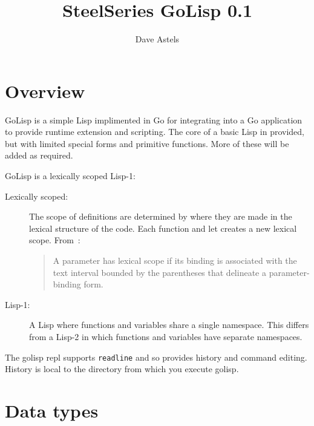 \documentclass[12pt]{article}
\title{SteelSeries GoLisp 0.1}
\author{Dave Astels}
\begin{document}
\maketitle

\section{Overview}

GoLisp is a simple Lisp implimented in Go for integrating into a Go
application to provide runtime extension and scripting. The core of a
basic Lisp in provided, but with limited special forms and primitive
functions. More of these will be added as required. 

GoLisp is a lexically scoped Lisp-1:

\begin{description}
\item[Lexically scoped:] The scope of definitions are determined by
  where they are made in the lexical structure of the code. Each
  function and let creates a new lexical scope. From~\cite{lisp}:

  \begin{quotation}
    A parameter has lexical scope if its binding is associated with
    the text interval bounded by the parentheses that delineate a
    parameter-binding form.
  \end{quotation}

\item[Lisp-1:] A Lisp where functions and variables share a single
  namespace. This differs from a Lisp-2 in which functions and
  variables have separate namespaces.
\end{description}

The golisp repl supports \verb|readline| and so provides history and
command editing. History is local to the directory from which you
execute golisp.

\section{Data types}
\end{document}
